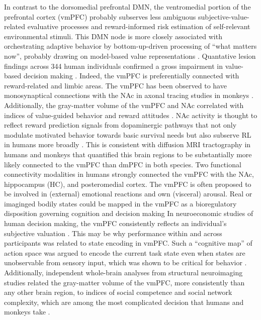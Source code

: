 \documentclass[10pt,letterpaper]{article}
\begin{document}
In contrast to the dorsomedial prefrontal DMN,
the ventromedial portion of the prefrontal cortex (vmPFC) probably subserves
less ambiguous subjective-value-related evaluative processes and
reward-informed risk estimation of self-relevant environmental stimuli.
This DMN node is more closely associated with
orchestrating adaptive behavior by bottom-up-driven
processing of “what matters now”,
probably drawing on model-based value representations
\citep{doherty2015structure}.
Quantative lesion findings across 344 human individuals confirmed
a gross impairment in value-based decision making
\citep{glascher2012lesion}.
Indeed,
the vmPFC is preferentially connected with reward-related and limbic areas.
The vmPFC has been observed to have monosynaptical connections
with the NAc
in axonal tracing studies in monkeys \citep{haber1995orbital}.
Additionally, the gray-matter volume of the vmPFC and NAc
correlated with indices of value-guided behavior and reward attitudes
\citep{lebreton2009automatic}.
NAc activity is thought to reflect reward prediction signals from dopaminergic pathways
\citep{schultz1998predictive}
that not only modulate motivated behavior towards basic survival needs but also
subserve RL in humans more broadly \citep{doherty2015structure}.
This is consistent with diffusion MRI tractography in humans and monkeys
\citep{croxson2005quantitative} that
quantified this brain regions to
be substantially more likely connected to the vmPFC than dmPFC in both species.
Two functional connectivity modalities in humans strongly connected
the vmPFC with the NAc, hippocampus (HC),
and posteromedial cortex.
%
The vmPFC is often proposed to be involved in (external) emotional
reactions and own (visceral) arousal.
Real or imaginged bodily states could be mapped in the vmPFC
as a bioregulatory disposition governing cognition
and decision making \citep{damasio1996somatic}
In neuroeconomic studies of human decision making,
the vmPFC consistently reflects an individual’s subjective
valuation
\citep{behrens2008associative}.
This may be why performance within and across participants
was related to state encoding in vmPFC.
Such a ``cognitive map'' of action space was argued to encode
the current task state even when states are unobservable from sensory input,
which was shown to be critical for behavior \citep{Schuck2016}.
Additionally,
independent whole-brain analyses from structural
neuroimaging studies related the gray-matter volume of the vmPFC,
more consistently than any other
brain region, to indices of
social competence and social network complexity, which are
among the most complicated decision that humans and monkeys take
\citep{behrens2009computation}.
%
\end{document}
